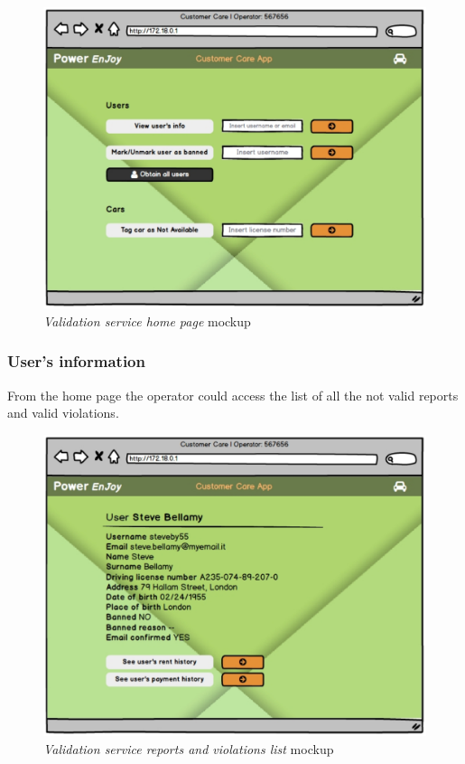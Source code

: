 \clearpage
 
 \begin{figure}[ht!]
			\centering
			\includegraphics[width=0.8\linewidth]{mockups/customerCare1}
			\caption{
				\label{fig:cc1} 
				\emph{Validation service home page} mockup
			}
		\end{figure}
		
\subsubsection{User's information}

From the home page the operator could access the list of all the not valid reports and valid violations.

\begin{figure}[ht!]
	\centering
	\includegraphics[width=0.8\linewidth]{mockups/customerCare2}
	\caption{
		\label{fig:cc2} 
		\emph{Validation service reports and violations list} mockup
	}
\end{figure}